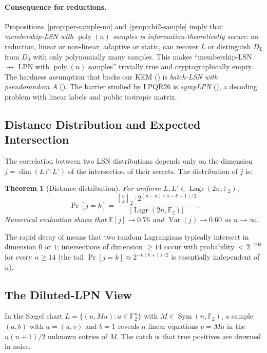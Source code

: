 \documentclass[11pt,a4paper]{article}
\theoremstyle{plain}
\newtheorem{theorem}{Theorem}[section]
\theoremstyle{definition}
\newcommand{\F}{\mathbb{F}}
\newcommand{\E}{\mathbb{E}}
\DeclareMathOperator{\Lagr}{Lagr}
\begin{document}
\paragraph{Consequence for reductions.} Propositions~\ref{prop:per-sample-mi} and~\ref{prop:chi2-sample} imply that \emph{membership-LSN with $\operatorname{poly}(n)$ samples is information-theoretically secure}: no reduction, linear or non-linear, adaptive or static, can recover $L$ or distinguish $D_L$ from $D_0$ with only polynomially many samples.  This makes ``membership-LSN $\not\to$ LPN with $\operatorname{poly}(n)$ samples'' trivially true and cryptographically empty.  The hardness assumption that backs our KEM () is \emph{batch-LSN with pseudorandom $A$} ().  The barrier studied by LPQR26 is \emph{sympLPN} (), a decoding problem with linear labels and public isotropic matrix.

\subsection{Distance Distribution and Expected Intersection}
\label{subsec:distance}

The correlation between two LSN distributions depends only on the dimension $j = \dim(L \cap L')$ of the intersection of their secrets. The distribution of $j$ is:

\begin{theorem}[Distance distribution]
\label{thm:distance}
For uniform $L, L' \in \Lagr(2n, \F_2)$,
\[
\Pr[j=k] = \frac{{n \brack k}_2 \cdot 2^{(n-k)(n-k+1)/2}}{|\Lagr(2n,\F_2)|}.
\]
Numerical evaluation shows that $\E[j] \to 0.76$ and $\operatorname{Var}(j) \to 0.60$ as $n \to \infty$.
\end{theorem}

The rapid decay of  means that two random Lagrangians typically intersect in dimension $0$ or $1$; intersections of dimension $\geq 14$ occur with probability $< 2^{-100}$ for every $n \geq 14$ (the tail $\Pr[j=k] \approx 2^{-k(k+1)/2}$ is essentially independent of $n$).

\subsection{The Diluted-LPN View}
\label{subsec:diluted-lpn}

In the Siegel chart $L = \{(u, Mu) : u \in \F_2^n\}$ with $M \in \operatorname{Sym}(n,\F_2)$, a sample $(a,b)$ with $a=(u,v)$ and $b=1$ reveals $n$ linear equations $v = Mu$ in the $n(n+1)/2$ unknown entries of $M$.  The catch is that true positives are drowned in noise.
\end{document}
